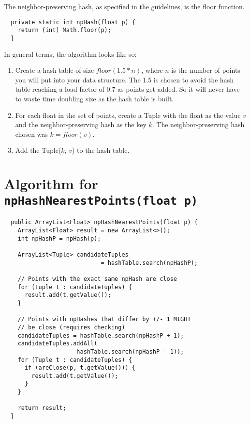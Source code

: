 \documentclass[12pt]{article}
\begin{document}
The neighbor-preserving hash, as specified in the guidelines, is the
floor function. \\

\begin{lstlisting}
  private static int npHash(float p) {
    return (int) Math.floor(p);
  }
\end{lstlisting}

In general terms, the algorithm looks like so: \\

\begin{enumerate}
\item Create a hash table of size $floor(1.5 * n)$, where $n$ is the
  number of points you will put into your data structure. The 1.5 is
  chosen to avoid the hash table reaching a load factor of 0.7
  as points get added. So it will never have to waste time doubling
  size as the hash table is built.
\item For each float in the set of points, create a Tuple with the
  float as the value $v$ and the neighbor-preserving hash as the
  key $k$. The neighbor-preserving hash chosen was $k = floor(v)$.
  \item Add the Tuple($k$, $v$) to the hash table.
  \end{enumerate}

  

\pagebreak
\section{Algorithm for
  \lstinline[basicstyle=\ttfamily\Large]
  |npHashNearestPoints(float p)|}

\begin{lstlisting}
  public ArrayList<Float> npHashNearestPoints(float p) {
    ArrayList<Float> result = new ArrayList<>();
    int npHashP = npHash(p);

    ArrayList<Tuple> candidateTuples
                            = hashTable.search(npHashP);

    // Points with the exact same npHash are close
    for (Tuple t : candidateTuples) {
      result.add(t.getValue());
    }

    // Points with npHashes that differ by +/- 1 MIGHT
    // be close (requires checking)
    candidateTuples = hashTable.search(npHashP + 1);
    candidateTuples.addAll(
                     hashTable.search(npHashP - 1));
    for (Tuple t : candidateTuples) {
      if (areClose(p, t.getValue())) {
        result.add(t.getValue());
      }
    }

    return result;
  }
\end{lstlisting}
\end{document}

